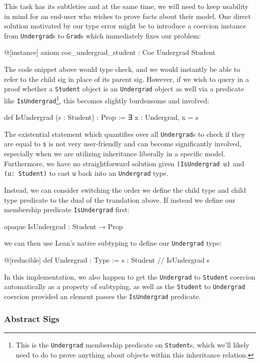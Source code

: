 This task has its subtleties and at the same time, we will need to keep usability in mind for an end-user who wishes to prove facts about their model. One direct solution motivated by our type error might be to introduce a coercion instance from \texttt{Undergrad}s to \texttt{Grad}s which immediately fixes our problem:
\begin{lean*}@[instance] axiom coe_undergrad_student : Coe Undergrad Student\end{lean*}
The code snippet above would type check, and we would instantly be able to refer to the child sig in place of its parent sig. However, if we wish to query in a proof whether a \texttt{Student} object is an \texttt{Undergrad} object as well via a predicate like \texttt{IsUndergrad}\footnote{This is the \texttt{Undergrad} membership predicate on \texttt{Student}s, which we'll likely need to do to prove anything about objects within this inheritance relation.}, this becomes slightly burdensome and involved:
\begin{lean*}def IsUndergrad (s : Student) : Prop := ∃ x : Undergrad, x = s\end{lean*}
The existential statement which quantifies over all \texttt{Undergrad}s to check if they are equal to \texttt{s} is not very user-friendly and can become significantly involved, especially when we are utilizing inheritance liberally in a specific model. Furthermore, we have no straightforward solution given \texttt{(IsUndergrad u)} and \texttt{(u: Student)} to cast \texttt{u} back into an \texttt{Undergrad} type. 

Instead, we can consider switching the order we define the child type and child type predicate to the dual of the translation above. If instead we define our membership predicate \texttt{IsUndergrad} first:
\begin{lean*}opaque IsUndergrad : Student → Prop\end{lean*}
we can then use Lean's native subtyping to define our \texttt{Undergrad} type:
\begin{lean*}
@[reducible] def Undergrad : Type :=
  { s : Student // IsUndergrad s }
\end{lean*}
In this implementation, we also happen to get the \texttt{Undergrad} to \texttt{Student} coercion automatically as a property of subtyping, as well as the \texttt{Student} to \texttt{Undergrad} coercion provided an element passes the \texttt{IsUndergrad} predicate. 

\subsubsection{Abstract Sigs}


